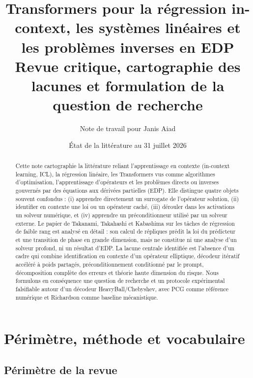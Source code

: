 \documentclass[11pt,a4paper]{article}
\title{Transformers pour la régression in-context, les systèmes linéaires et les problèmes inverses en EDP\\
\large Revue critique, cartographie des lacunes et formulation de la question de recherche}
\author{Note de travail pour Janis Aiad}
\date{État de la littérature au 31 juillet 2026}
\begin{document}
\sloppy
\maketitle

\begin{abstract}
Cette note cartographie la littérature reliant l'apprentissage en contexte
(in-context learning, ICL), la régression linéaire, les Transformers vus comme
algorithmes d'optimisation, l'apprentissage d'opérateurs et les problèmes
directs ou inverses gouvernés par des équations aux dérivées partielles (EDP).
Elle distingue quatre objets souvent confondus : (i) apprendre directement un
surrogate de l'opérateur solution, (ii) identifier en contexte une loi ou un
opérateur caché, (iii) dérouler dans les activations un solveur numérique, et
(iv) apprendre un préconditionneur utilisé par un solveur externe. Le papier
de Takanami, Takahashi et Kabashima sur les tâches de régression de faible rang
est analysé en détail : son calcul de répliques prédit la loi du prédicteur et
une transition de phase en grande dimension, mais ne constitue ni une analyse
d'un solveur profond, ni un résultat d'EDP. La lacune centrale identifiée est
l'absence d'un cadre qui combine identification en contexte d'un opérateur
elliptique, décodeur itératif accéléré à poids partagés, préconditionnement
conditionné par le prompt, décomposition complète des erreurs et théorie
haute dimension du risque. Nous formulons en conséquence une question de
recherche et un protocole expérimental falsifiable autour d'un décodeur
HeavyBall/Chebyshev, avec PCG comme référence numérique et Richardson comme
baseline mécanistique.
\end{abstract}

\tableofcontents
\clearpage

\section{Périmètre, méthode et vocabulaire}

\subsection{Périmètre de la revue}
\end{document}
